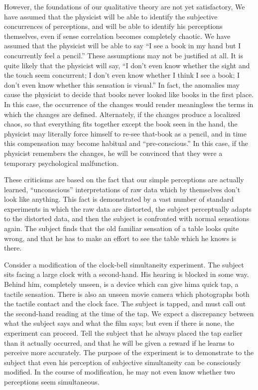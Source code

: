 However, the foundations of our qualitative theory are not yet satisfactory, We have assumed that the physicist will be able to identify the subjective concurrences of perceptions, and will be able to identify his perceptions themselves, even if sense correlation becomes completely chaotic. We have assumed that the physicist will be able to say \enquote{I see a book in my hand but I concurrently feel a pencil.} These assumptions may not be justified at all. It is quite likely that the physicist will say, \enquote{I don't even know whether the sight and the touch seem concurrent; I don't even know whether I think I see a book; I don't even know whether this sensation is visual.} In fact, the anomalies may cause the physicist to decide that books never looked like books in the first place. In this case, the occurrence of the changes would render meaningless the terms in which the changes are defined. Alternately, if the changes produce a localized chaos, so that everything fits together except the book seen in the hand, the physicist may literally force himself to re-see that-book as a pencil, and in time this compensation may become habitual and \enquote{pre-conscious.} In this case, if the physicist remembers the changes, he will be convinced that they were a temporary psychological malfunction. 

These criticisms are based on the fact that our simple perceptions are actually learned, \enquote{unconscious} interpretations of raw data which by themselves don't look like anything. This fact is demonstrated by a vast number of standard experiments in which the raw data are distorted, the subject perceptually adapts to the distorted data, and then the subject is confronted with normal sensations again. The subject finds that the old familiar sensation of a table looks quite wrong, and that he has to make an effort to see the table which he knows is there. 

Consider a modification of the clock-bell simultaneity experiment. The subject sits facing a large clock with a second-hand. His hearing is blocked in some way. Behind him, completely unseen, is a device which can give hima quick tap, a tactile sensation. There is also an unseen movie camera which photographs both the tactile contact and the clock face. The subject is tapped, and must call out the second-hand reading at the time of the tap. We expect a discrepancy between what the subject says and what the film says; but even if there is none, the experiment can proceed. Tell the subject that he always placed the tap earlier than it actually occurred, and that he will be given a reward if he learns to perceive more accurately. The purpose of the experiment is to demonstrate to the subject that even his perception of subjective simultaneity can be consciously modified. In the course of modification, he may not even know whether two perceptions seem simultaneous. 

